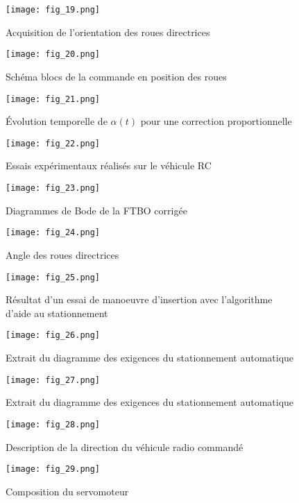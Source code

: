 \begin{figure}[H]
\centering
\texttt{[image: fig\_19.png]}
\caption{Acquisition de l’orientation des roues directrices \label{fig_19}}
\end{figure}


\begin{figure}[H]
\centering
\texttt{[image: fig\_20.png]}
\caption{Schéma blocs de la commande en position des roues \label{fig_20}}
\end{figure}


\begin{figure}[H]
\centering
\texttt{[image: fig\_21.png]}
\caption{Évolution temporelle de $\alpha(t)$ pour une correction proportionnelle \label{fig_21}}
\end{figure}


\begin{figure}[H]
\centering
\texttt{[image: fig\_22.png]}
\caption{Essais expérimentaux réalisés sur le véhicule RC \label{fig_22}}
\end{figure}


\begin{figure}[H]
\centering
\texttt{[image: fig\_23.png]}
\caption{Diagrammes de Bode de la FTBO corrigée \label{fig_23}}
\end{figure}


\begin{figure}[H]
\centering
\texttt{[image: fig\_24.png]}
\caption{Angle des roues directrices \label{fig_24}}
\end{figure}


\begin{figure}[H]
\centering
\texttt{[image: fig\_25.png]}
\caption{Résultat d’un essai de manoeuvre d’insertion avec l’algorithme d’aide au stationnement \label{fig_25}}
\end{figure}


\begin{figure}[H]
\centering
\texttt{[image: fig\_26.png]}
\caption{Extrait du diagramme des exigences du stationnement automatique \label{fig_26}}
\end{figure}


\begin{figure}[H]
\centering
\texttt{[image: fig\_27.png]}
\caption{Extrait du diagramme des exigences du stationnement automatique \label{fig_27}}
\end{figure}


\begin{figure}[H]
\centering
\texttt{[image: fig\_28.png]}
\caption{Description de la direction du véhicule radio commandé \label{fig_28}}
\end{figure}


\begin{figure}[H]
\centering
\texttt{[image: fig\_29.png]}
\caption{Composition du servomoteur \label{fig_29}}
\end{figure}